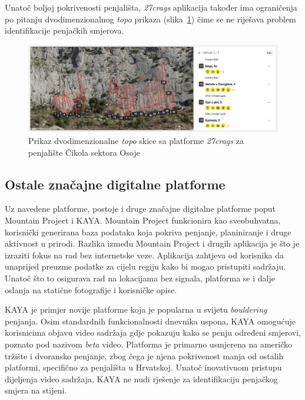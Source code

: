Unatoč boljoj pokrivenosti penjališta, \textit{27crags} aplikacija također ima ograničenja po pitanju dvodimenzionalnog \textit{topo} prikaza (slika~\ref{fig:cikola_27crags_topo}) čime se ne riješava problem identifikacije penjačkih smjerova.

\begin{figure}[H]
    \centering
    \includegraphics[width=1\textwidth]{images/analiza/cikola_27crags_topo.jpeg}
    \caption{Prikaz dvodimenzionalne \textit{topo} skice sa platforme \textit{27crags} za penjalište Čikola sektora Osoje}
    \label{fig:cikola_27crags_topo}
\end{figure}

\subsection{Ostale značajne digitalne platforme}

Uz navedene platforme, postoje i druge značajne digitalne platforme poput Mountain Project i KAYA. Mountain Project funkcionira kao sveobuhvatna, korisnički generirana baza podataka koja pokriva penjanje, planiniranje i druge aktivnost u prirodi. Razlika između Mountain Project i drugih aplikacija je što je izraziti fokus na rad bez internetske veze. Aplikacija zahtjeva od korisnika da unaprijed preuzme podatke za cijelu regiju kako bi mogao pristupiti sadržaju. Unatoč što to osigurava rad na lokacijama bez signala, platforma se i dalje oslanja na statične fotografije i korisničke opise.

KAYA je primjer novije platforme koja je popularna u svijetu \textit{bouldering} penjanja. Osim standardnih funkcionalnosti dnevnika uspona, KAYA omogućuje korisnicima objavu video sadržaja gdje pokazuju kako se penju određeni smjerovi, poznato pod nazivom \textit{beta} video.  Platforma je primarno usmjerena na američko tržište i dvoransko penjanje, zbog čega je njena pokrivenost manja od ostalih platformi, specifično za penjališta u Hrvatskoj. Unatoč inovativnom pristupu dijeljenja video sadržaja, KAYA ne nudi rješenje za identifikaciju penjačkog smjera na stijeni.


